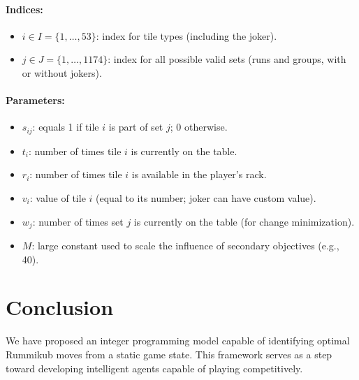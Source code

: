 \documentclass[11pt,letterpaper]{article}
\begin{document}
\paragraph{Indices:}
\begin{itemize}
    \item $i \in I = \{1, \dots, 53\}$: index for tile types (including the joker).
    \item $j \in J = \{1, \dots, 1174\}$: index for all possible valid sets (runs and groups, with or without jokers).
\end{itemize}

\paragraph{Parameters:}
\begin{itemize}
    \item $s_{ij}$: equals 1 if tile $i$ is part of set $j$; 0 otherwise.
    \item $t_i$: number of times tile $i$ is currently on the table.
    \item $r_i$: number of times tile $i$ is available in the player's rack.
    \item $v_i$: value of tile $i$ (equal to its number; joker can have custom value).
    \item $w_j$: number of times set $j$ is currently on the table (for change minimization).
    \item $M$: large constant used to scale the influence of secondary objectives (e.g., 40).
\end{itemize}

\section*{Conclusion}
We have proposed an integer programming model capable of identifying optimal Rummikub moves from a static game state. This framework serves as a step toward developing intelligent agents capable of playing competitively.



\end{document}
